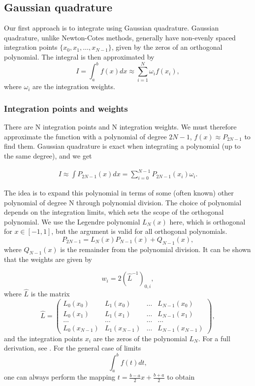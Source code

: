\documentclass{emulateapj}
\begin{document}
\subsection{Gaussian quadrature}
Our first approach is to integrate using Gaussian quadrature. Gaussian quadrature, unlike Newton-Cotes methods, generally have non-evenly spaced integration points $\{x_0 , x_1 , \dots , x_{N-1}\}$, given by the zeros of an orthogonal polynomial. The integral is then approximated by
\begin{equation}
	I = \int_a^b f(x) dx \approx \sum^N_{i = 1} \omega_i f(x_i),
	\label{eq:quadrature}
\end{equation}
where $\omega_i$ are the integration weights.

\subsubsection{Integration points and weights}
There are N integration points and N integration weights. We must therefore approximate the function with a polynomial of degree $2N-1$, $f(x) \approx P_{2N-1}$ to find them. Gaussian quadrature is exact when integrating a polynomial (up to the same degree), and we get

\begin{align}
	I \approx \int P_{2N-1}(x)dx = \sum^{N-1}_{i=0}P_{2N-1}(x_i) \omega_i.
\end{align}

The idea is to expand this polynomial in terms of some (often known) other polynomial of degree N through polynomial division. The choice of polynomial depends on the integration limits, which sets the scope of the orthogonal polynomial. We use the Legendre polynomial $L_N(x)$ here, which is orthogonal for $x\in [-1,1]$, but the argument is valid for all orthogonal polynomials.
\begin{equation}
	P_{2N-1} = L_N(x)P_{N-1}(x) + Q_{N-1}(x),
\end{equation}
where $Q_{N-1}(x)$ is the remainder from the polynomial division. It can be shown that the weights are given by

\begin{equation}
    w_i = 2\left(\hat{L}^{-1}\right)_{0,i},
\end{equation}
where $\hat{L}$ is the matrix
\begin{equation*}
   \hat{L}=\left(\begin{array} {cccc} L_0(x_0)  & L_1(x_0) &\dots &L_{N-1}(x_0)\\
                                   L_0(x_1)  & L_1(x_1) &\dots &L_{N-1}(x_1)\\
                                   \dots  & \dots &\dots &\dots\\
L_0(x_{N-1})  & L_1(x_{N-1}) &\dots &L_{N-1}(x_{N-1})
\end{array}\right),
\end{equation*}
and the integration points $x_i$ are the zeros of the polynomial $L_N$. For a full derivation, see \cite{Lecture1}. For the general case of limits
\begin{equation}
    \int_a^b f(t) dt,
\end{equation}
one can always perform the mapping $t = \frac{b-a}{2}x + \frac{b+a}{2}$ to obtain
\end{document}
